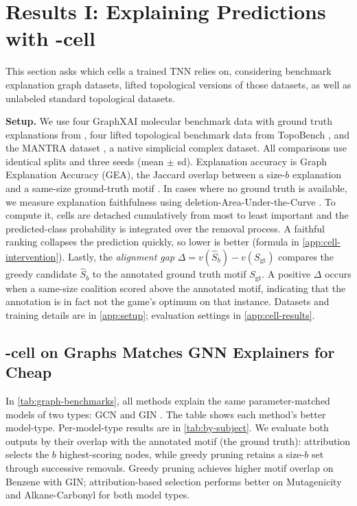 % 
\section{Results I: Explaining Predictions with \method-cell}
\label{sec:predictions}

This section asks which cells a trained TNN relies on, considering benchmark explanation graph datasets, lifted topological versions of those datasets, as well as unlabeled standard topological datasets.

\textbf{Setup.} We use four GraphXAI molecular benchmark data with ground truth explanations from \citet{agarwal2023graphxai}, four lifted topological benchmark data from TopoBench \citep{telyatnikov2024topobench}, and the MANTRA dataset \citep{ballester2025mantra}, a native simplicial complex dataset. All comparisons use identical splits and three seeds (mean $\pm$ sd).  Explanation accuracy is Graph Explanation Accuracy (GEA), the Jaccard overlap between a size-$b$ explanation and a same-size ground-truth motif \citep{agarwal2023graphxai}. In cases where no ground truth is available, we measure explanation faithfulness using deletion-Area-Under-the-Curve \citep[deletion-AUC;][]{petsiuk2018rise}. To compute it, cells are detached cumulatively from most to least important and the predicted-class probability is integrated over the removal process. A faithful ranking collapses the prediction quickly, so lower is better (formula in \cref{app:cell-intervention}). Lastly, the \emph{alignment gap} $\Delta = v(\hat{S}_{b}) - v(S_{\mathrm{gt}})$ compares the greedy candidate $\hat{S}_{b}$ to the annotated ground truth motif $S_{\mathrm{gt}}$. A positive $\Delta$ occurs when a same-size coalition scored above the annotated motif, indicating that the annotation is in fact not the game's optimum on that instance. Datasets and training details are in \cref{app:setup}; evaluation settings in \cref{app:cell-results}.

\subsection{\method-cell on Graphs Matches GNN Explainers for Cheap}
\label{sec:predictions-rank1}



 In \cref{tab:graph-benchmarks}, all methods explain the same parameter-matched models of two types: GCN \citep{kipf2017semisupervised} and GIN \citep{xu2018how}. The table shows each method's better model-type. Per-model-type results are in \cref{tab:by-subject}. We evaluate both outputs by their overlap with the annotated motif (the ground truth): attribution selects the $b$ highest-scoring nodes, while greedy pruning retains a size-$b$ set through successive removals. Greedy pruning achieves higher motif overlap on Benzene with GIN; attribution-based selection performs better on Mutagenicity and Alkane-Carbonyl for both model types.

